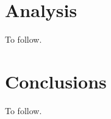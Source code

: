\documentclass[fleqn,usenatbib]{mnras}
\begin{document}
\section{Analysis}
\label{sec:analysis}

To follow.

\section{Conclusions}
\label{sec:conclusions}

To follow.










%




\bsp	%
\label{lastpage}
\end{document}
